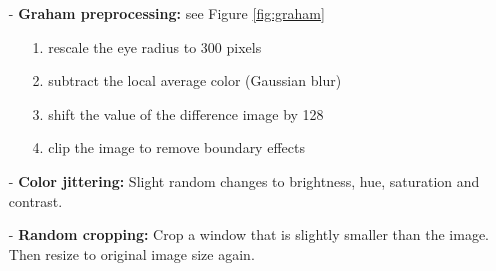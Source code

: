 \documentclass{article}
\begin{document}
\begin{itemize}
  \item[-] \textbf{Graham preprocessing:}\cite{graham2015} see Figure \ref{fig:graham}\begin{itemize}
    \item[1.] rescale the eye radius to 300 pixels 
    \item[2.] subtract the local average color (Gaussian blur) 
    \item[3.] shift the value of the difference image by 128
    \item[4.] clip the image to remove boundary effects
  \end{itemize}   
  \item[-] \textbf{Color jittering:} Slight random changes to brightness, hue, saturation and contrast.
  \item[-] \textbf{Random cropping:} Crop a window that is slightly smaller than the image. Then resize to original image size again.
\end{itemize}

\end{document}
